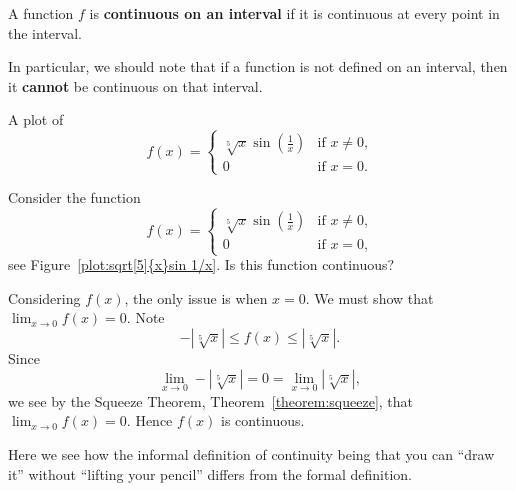 \begin{definition} A function $f$ is \textbf{continuous on an interval} if it is
continuous at every point in the interval.
\end{definition}

In particular, we should note that if a function is not defined on an
interval, then it \textbf{cannot} be continuous on that interval.
\begin{marginfigure}[0in]
\caption[A continuous function.]{A plot of
\[
f(x)=
\begin{cases}
\sqrt[5]{x}\sin\left(\frac{1}{x}\right) & \text{if $x \ne 0$,}\\
 0 & \text{if $x = 0$.}
\end{cases}
\]
}
\label{plot:sqrt[5]{x}sin 1/x}
\end{marginfigure}

\begin{example}
Consider the function
\[
f(x) = 
\begin{cases}
\sqrt[5]{x}\sin\left(\frac{1}{x}\right) & \text{if $x \ne 0$,}\\
0 & \text{if $x = 0$,}
\end{cases}
\]
see Figure~\ref{plot:sqrt[5]{x}sin 1/x}. Is this function continuous?
\end{example}

\begin{solution}
Considering $f(x)$, the only issue is when $x=0$. We must show that
$\lim_{x\to 0} f(x) = 0$. Note
\[
-|\sqrt[5]{x}|\le f(x) \le |\sqrt[5]{x}|.
\]
Since
\[
\lim_{x\to 0} -|\sqrt[5]{x}| = 0 = \lim_{x\to 0}|\sqrt[5]{x}|,
\]
we see by the Squeeze Theorem, Theorem~\ref{theorem:squeeze}, that
$\lim_{x\to 0} f(x) = 0$. Hence $f(x)$ is continuous.

Here we see how the informal definition of continuity being that you
can ``draw it'' without ``lifting your pencil'' differs from the
formal definition.
\end{solution}

